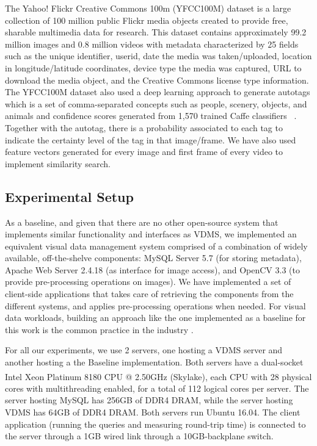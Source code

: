 The Yahoo! Flickr Creative Commons 100m (YFCC100M) dataset is a large
collection of 100 million public Flickr media objects created to provide free,
sharable multimedia data for research. This dataset contains approximately
99.2 million images and 0.8 million videos with metadata characterized by
25 fields such as the unique identifier, userid,
date the media was taken/uploaded, location in longitude/latitude coordinates,
device type the media was captured, URL to download the media object,
and the Creative Commons license type information.
The YFCC100M dataset also used a deep learning approach to generate autotags
which is a set of comma-separated concepts such as people, scenery, objects,
and animals and confidence scores generated from 1,570 trained
Caffe classifiers ~\cite{Thomee_2016}. Together with the autotag, there is a
probability associated to each tag to indicate the certainty level of the tag
in that image/frame.
We have also used feature vectors generated for every image and first frame
of every video \cite{features} to implement similarity search.

\subsection{Experimental Setup}

As a baseline, and given that there are no other open-source system
that implements similar functionality and interfaces as VDMS,
we implemented an equivalent visual data management system comprised of a
combination of widely available, off-the-shelve components:
MySQL Server 5.7 (for storing metadata),
Apache Web Server 2.4.18 (as interface for image access), and
OpenCV 3.3 (to provide pre-processing operations on images).
We have implemented a set of client-side applications that takes care
of retrieving the components from the different systems, and applies
pre-processing operations when needed.
For visual data workloads, building an approach like the one
implemented as a baseline for this work
is the common practice in the industry \cite{heystack, tao}.

For all our experiments, we use 2 servers, one hosting a VDMS server and
another hosting a the Baseline implementation.
Both servers have a dual-socket Intel\textsuperscript{\textregistered}
Xeon\textsuperscript{\textregistered} Platinum 8180 CPU @ 2.50GHz (Skylake),
each CPU with 28 physical cores with multithreading enabled,
for a total of 112 logical cores per server.
The server hosting MySQL has 256GB of DDR4 DRAM, while the server hosting VDMS
has 64GB of DDR4 DRAM. Both servers run Ubuntu 16.04.
The client application (running the queries and measuring round-trip time)
is connected to the server through a 1GB wired link through
a 10GB-backplane switch.

